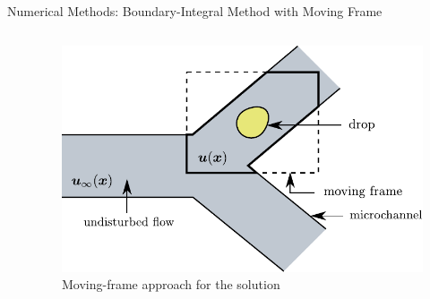 \documentclass[final]{beamer}
\newlength{\colwidth}
\begin{document}
\begin{frame}[t]
\begin{columns}[t]
\begin{column}{\colwidth}
\begin{block}{Numerical Methods: Boundary-Integral Method with Moving Frame}
\begin{columns}
\begin{column}{.45\textwidth}
        \end{column}

        \begin{column}{.55 \textwidth} %

        \begin{figure}
            \centering
            \includegraphics[width=0.98\linewidth]{figures/movingframe.pdf}
            \caption{Moving-frame approach for the solution \cite*{navarro_boundary-integral_2020, Roure_2022} }
            \label{fig:movingframe}
        \end{figure}

        \centering

        \end{column}
        \normalsize
    \end{columns}
  \end{block}


\end{column}
\end{columns}
\end{frame}
\end{document}
